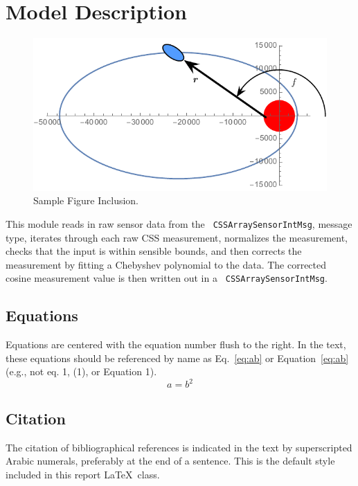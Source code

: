 
\section{Model Description}

\begin{figure}[H]
	\centerline{
		\includegraphics{Figures/Fig1}
	}
	\caption{Sample Figure Inclusion.}
	\label{fig:Fig1}
\end{figure}

This module reads in raw sensor data from the \verb. CSSArraySensorIntMsg., message type, iterates through each raw CSS measurement, normalizes the measurement, checks that the input is within sensible bounds, and then corrects the measurement by fitting a Chebyshev polynomial to the data. The corrected cosine measurement value is then written out in a \verb. CSSArraySensorIntMsg.. 

\subsection{Equations}
Equations are centered with the equation number flush to the right. In the text, these equations should be referenced by name as Eq.~\eqref{eq:ab} or Equation~\eqref{eq:ab} (e.g., not eq.  1, (1), or Equation 1).
\begin{equation}
	\label{eq:ab}
	a = b^{2}
\end{equation}

\subsection{Citation}
The citation of bibliographical references is indicated in the text by superscripted Arabic numerals, preferably at the end of a sentence.  This is the default style included in this report \LaTeX\ class.\cite{pines1973}

